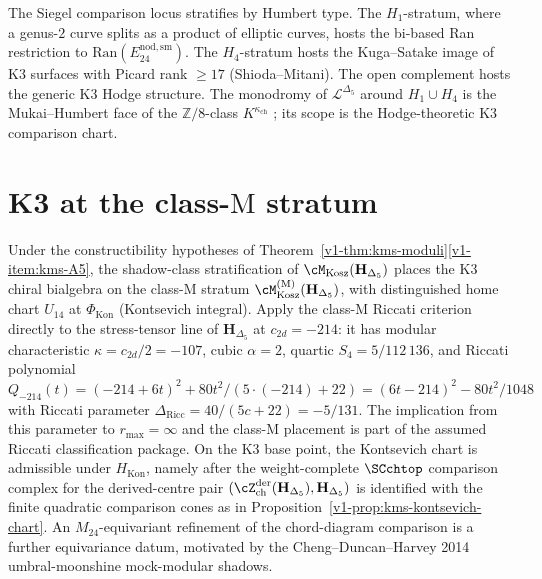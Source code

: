 \begin{remark}
\label{rem:kms-2}
The Siegel comparison locus stratifies by Humbert type. The
$H_1$-stratum, where a genus-$2$ curve splits as a product of
elliptic curves, hosts the bi-based Ran restriction to
$\mathrm{Ran}(E^{\mathrm{nod,sm}}_{24})$. The $H_4$-stratum
hosts the Kuga--Satake image of K3 surfaces with Picard rank
$\geq 17$ (Shioda--Mitani). The open complement hosts the
generic K3 Hodge structure. The monodromy of
$\mathcal L^{\Delta_5}$ around $H_1\cup H_4$ is the
Mukai--Humbert face of the $\mathbb Z/8$-class
$K^{\kappa_{\mathrm{ch}}}$ \cite{Bruinier2002,KugaSatake1967};
its scope is the Hodge-theoretic K3 comparison chart.
\end{remark}

\section{K3 at the class-$\mathrm M$ stratum}
\label{sec:kms-supplement-ii}

\begin{remark}
\label{rem:kms-K3-placement}
Under the constructibility hypotheses of
Theorem~\ref{v1-thm:kms-moduli}\ref{v1-item:kms-A5}, the
shadow-class stratification of
$\cM_{\mathrm{Kosz}}(\mathbf H_{\Delta_5})$ places the K3 chiral
bialgebra on the class-$\mathrm M$ stratum
$\cM^{(\mathrm M)}_{\mathrm{Kosz}}(\mathbf H_{\Delta_5})$, with
distinguished home chart $U_{14}$ at $\Phi_{\mathrm{Kon}}$
(Kontsevich integral). Apply the class-$\mathrm M$ Riccati criterion
directly to the stress-tensor line of $\mathbf H_{\Delta_5}$ at
$c_{2d} = -214$: it has modular characteristic
$\kappa = c_{2d}/2 = -107$, cubic $\alpha = 2$, quartic
$S_4 = 5/112\,136$, and Riccati polynomial
$Q_{-214}(t) = (-214 + 6t)^2 + 80 t^2/(5\cdot(-214)+22)
= (6t - 214)^2 - 80 t^2/1048$ with Riccati parameter
$\Delta_{\mathrm{Ricc}} = 40/(5c+22) = -5/131$.
The implication from this parameter to $r_{\max}=\infty$ and the
class-$\mathrm M$ placement is part of the assumed Riccati
classification package. On the K3 base point, the
Kontsevich chart is admissible under $H_{\mathrm{Kon}}$, namely after the
weight-complete $\SCchtop$ comparison complex for the
derived-centre pair
$(\cZ^{\mathrm{der}}_{\mathrm{ch}}(\mathbf H_{\Delta_5}),
\mathbf H_{\Delta_5})$ is identified with the finite quadratic
comparison cones as in
Proposition~\ref{v1-prop:kms-kontsevich-chart}.  An
$M_{24}$-equivariant refinement of the chord-diagram comparison is a
further equivariance datum, motivated by the
Cheng--Duncan--Harvey 2014 umbral-moonshine mock-modular shadows.
\end{remark}


